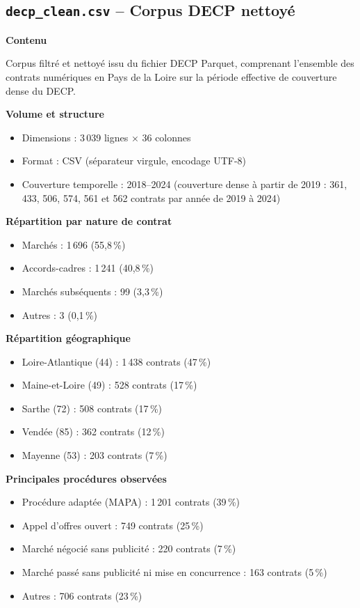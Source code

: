 \documentclass[12pt,a4paper]{article}
\begin{document}
\subsection{\texttt{decp\_clean.csv} -- Corpus DECP nettoyé}

\textbf{Contenu}

Corpus filtré et nettoyé issu du fichier DECP Parquet, comprenant l'ensemble
des contrats numériques en Pays de la Loire sur la période effective de
couverture dense du DECP.

\medskip
\textbf{Volume et structure}

\begin{itemize}
  \item[---] Dimensions : 3\,039 lignes × 36 colonnes
  \item[---] Format : CSV (séparateur virgule, encodage UTF-8)
  \item[---] Couverture temporelle : 2018--2024 (couverture dense à partir de
    2019 : 361, 433, 506, 574, 561 et 562 contrats par année de 2019 à 2024)
\end{itemize}

\medskip
\textbf{Répartition par nature de contrat}

\begin{itemize}
  \item[---] Marchés : 1\,696 (55,8\,\%)
  \item[---] Accords-cadres : 1\,241 (40,8\,\%)
  \item[---] Marchés subséquents : 99 (3,3\,\%)
  \item[---] Autres : 3 (0,1\,\%)
\end{itemize}

\medskip
\textbf{Répartition géographique}

\begin{itemize}
  \item[---] Loire-Atlantique (44) : 1\,438 contrats (47\,\%)
  \item[---] Maine-et-Loire (49) : 528 contrats (17\,\%)
  \item[---] Sarthe (72) : 508 contrats (17\,\%)
  \item[---] Vendée (85) : 362 contrats (12\,\%)
  \item[---] Mayenne (53) : 203 contrats (7\,\%)
\end{itemize}

\medskip
\textbf{Principales procédures observées}

\begin{itemize}
  \item[---] Procédure adaptée (MAPA) : 1\,201 contrats (39\,\%)
  \item[---] Appel d'offres ouvert : 749 contrats (25\,\%)
  \item[---] Marché négocié sans publicité : 220 contrats (7\,\%)
  \item[---] Marché passé sans publicité ni mise en concurrence : 163 contrats
    (5\,\%)
  \item[---] Autres : 706 contrats (23\,\%)
\end{itemize}
\end{document}

